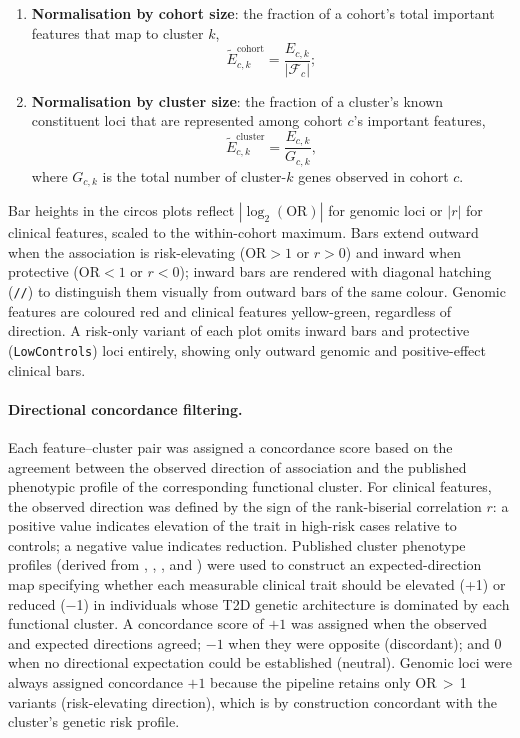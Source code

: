 \begin{enumerate}
  \item \textbf{Normalisation by cohort size}: the fraction of a cohort's total important features that map to cluster $k$,
  \begin{equation}
    \tilde{E}_{c,k}^{\text{cohort}} = \frac{E_{c,k}}{|\mathcal{F}_c|};
  \end{equation}

  \item \textbf{Normalisation by cluster size}: the fraction of a cluster's known constituent loci that are represented among cohort $c$'s important features,
  \begin{equation}
    \tilde{E}_{c,k}^{\text{cluster}} = \frac{E_{c,k}}{G_{c,k}},
  \end{equation}
  where $G_{c,k}$ is the total number of cluster-$k$ genes observed in cohort $c$.
\end{enumerate}

Bar heights in the circos plots reflect $|\log_2(\text{OR})|$ for genomic loci or $|r|$ for clinical features, scaled to the within-cohort maximum.
Bars extend outward when the association is risk-elevating ($\text{OR} > 1$ or $r > 0$) and inward when protective ($\text{OR} < 1$ or $r < 0$); inward bars are rendered with diagonal hatching (\texttt{//}) to distinguish them visually from outward bars of the same colour.
Genomic features are coloured red and clinical features yellow-green, regardless of direction.
A risk-only variant of each plot omits inward bars and protective (\texttt{LowControls}) loci entirely, showing only outward genomic and positive-effect clinical bars.

\paragraph{Directional concordance filtering.}
Each feature--cluster pair was assigned a concordance score based on the agreement between the observed direction of association and the published phenotypic profile of the corresponding functional cluster.
For clinical features, the observed direction was defined by the sign of the rank-biserial correlation $r$: a positive value indicates elevation of the trait in high-risk cases relative to controls; a negative value indicates reduction.
Published cluster phenotype profiles (derived from \citet{Udler2018}, \citet{Suzuki2024}, \citet{Kim2023}, and \citet{Yaghootkar2014}) were used to construct an expected-direction map specifying whether each measurable clinical trait should be elevated (+1) or reduced ($-$1) in individuals whose T2D genetic architecture is dominated by each functional cluster.
A concordance score of $+1$ was assigned when the observed and expected directions agreed; $-1$ when they were opposite (discordant); and $0$ when no directional expectation could be established (neutral).
Genomic loci were always assigned concordance $+1$ because the pipeline retains only OR\,$>$\,1 variants (risk-elevating direction), which is by construction concordant with the cluster's genetic risk profile.

